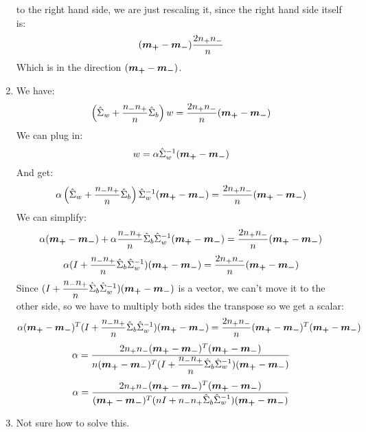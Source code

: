 \documentclass[12pt]{article}
\begin{document}
\begin{enumerate}[label = \letters]
    to the right hand side, we are just rescaling it,
    since the right hand side itself is:
    \[ (\boldsymbol{\boldsymbol{m_+}} - \boldsymbol{\boldsymbol{m_-}})\dfrac{2n_+n_-}{n} \]
    Which is in the direction $(\boldsymbol{\boldsymbol{m_+}} - \boldsymbol{\boldsymbol{m_-}})$.
    \item 
    We have:
    \[ \left( \hat{\Sigma}_w + 
    \dfrac{n_-n_+}{n} \hat{\Sigma}_b \right) w
    = \dfrac{2n_+n_-}{n}(\boldsymbol{\boldsymbol{m_+}} - \boldsymbol{\boldsymbol{m_-}}) \]
    We can plug in:
    \[ w = \alpha 
    \hat{\Sigma}_w^{-1}(\boldsymbol{\boldsymbol{m_+}} - \boldsymbol{\boldsymbol{m_-}})\]
    And get:
    \[ \alpha\left( \hat{\Sigma}_w + 
    \dfrac{n_-n_+}{n} \hat{\Sigma}_b \right)
    \hat{\Sigma}_w^{-1}(\boldsymbol{\boldsymbol{m_+}} - \boldsymbol{\boldsymbol{m_-}})
    = \dfrac{2n_+n_-}{n}(\boldsymbol{\boldsymbol{m_+}} - \boldsymbol{\boldsymbol{m_-}}) \]
    We can simplify:
    \[ \alpha(\boldsymbol{\boldsymbol{m_+}} - \boldsymbol{\boldsymbol{m_-}}) 
    + \alpha\dfrac{n_-n_+}{n} 
    \hat{\Sigma}_b\hat{\Sigma}_w^{-1}
    (\boldsymbol{\boldsymbol{m_+}} - \boldsymbol{\boldsymbol{m_-}}) 
    = \dfrac{2n_+n_-}{n}(\boldsymbol{\boldsymbol{m_+}} - \boldsymbol{\boldsymbol{m_-}}) \]
    \[ \alpha(I + \dfrac{n_-n_+}{n} 
    \hat{\Sigma}_b\hat{\Sigma}_w^{-1})
    (\boldsymbol{\boldsymbol{m_+}} - \boldsymbol{\boldsymbol{m_-}}) 
    = \dfrac{2n_+n_-}{n}(\boldsymbol{\boldsymbol{m_+}} - \boldsymbol{\boldsymbol{m_-}}) \]
    Since $(I + \dfrac{n_-n_+}{n} 
    \hat{\Sigma}_b\hat{\Sigma}_w^{-1})
    (\boldsymbol{\boldsymbol{m_+}} - \boldsymbol{\boldsymbol{m_-}})$ is a vector,
    we can't move it to the other side,
    so we have to multiply both sides
    the transpose so we get a scalar:
    \[ \alpha (\boldsymbol{\boldsymbol{m_+}} - \boldsymbol{\boldsymbol{m_-}})^T
    (I + \dfrac{n_-n_+}{n}\hat{\Sigma}_b\hat{\Sigma}_w^{-1})
    (\boldsymbol{\boldsymbol{m_+}} - \boldsymbol{\boldsymbol{m_-}}) 
    = \dfrac{2n_+n_-}{n}(\boldsymbol{\boldsymbol{m_+}} - \boldsymbol{\boldsymbol{m_-}})^T
    (\boldsymbol{\boldsymbol{m_+}} - \boldsymbol{\boldsymbol{m_-}}) \]
    \[ \alpha
    = \dfrac{2n_+n_- (\boldsymbol{\boldsymbol{m_+}} - \boldsymbol{\boldsymbol{m_-}})^T
    (\boldsymbol{\boldsymbol{m_+}} - \boldsymbol{\boldsymbol{m_-}})}{n(\boldsymbol{\boldsymbol{m_+}} - \boldsymbol{\boldsymbol{m_-}})^T
    (I + \dfrac{n_-n_+}{n}\hat{\Sigma}_b\hat{\Sigma}_w^{-1})
    (\boldsymbol{\boldsymbol{m_+}} - \boldsymbol{\boldsymbol{m_-}})} \]
    \[ \alpha
    = \dfrac{2n_+n_- (\boldsymbol{\boldsymbol{m_+}} - \boldsymbol{\boldsymbol{m_-}})^T
    (\boldsymbol{\boldsymbol{m_+}} - \boldsymbol{\boldsymbol{m_-}}) }{(\boldsymbol{\boldsymbol{m_+}} - \boldsymbol{\boldsymbol{m_-}})^T
    (nI + n_-n_+\hat{\Sigma}_b\hat{\Sigma}_w^{-1})
    (\boldsymbol{\boldsymbol{m_+}} - \boldsymbol{\boldsymbol{m_-}})} \]
    \item
    Not sure how to solve this.
\end{enumerate}

\newpage
\end{document}
